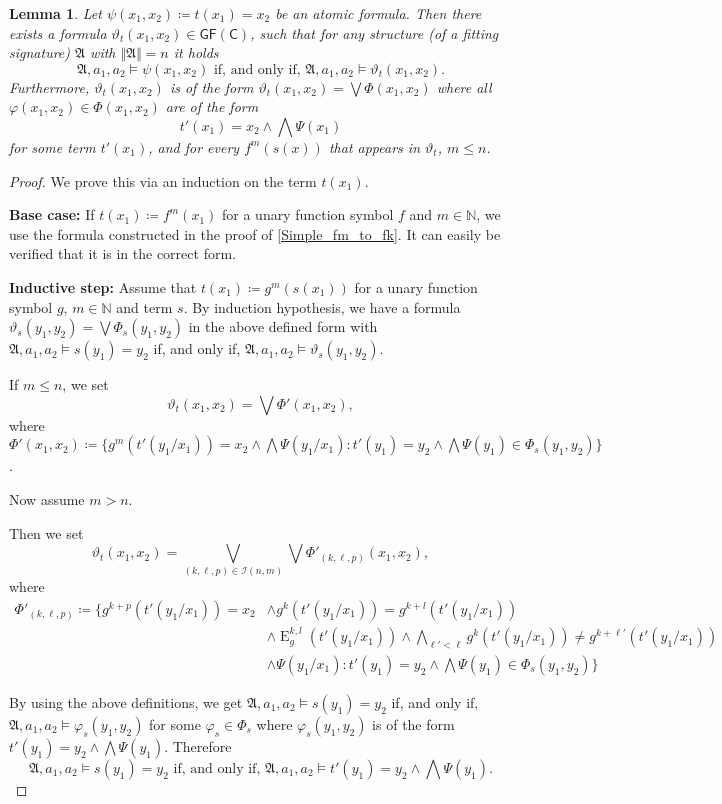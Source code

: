 \documentclass[a4paper,11pt,DIV=15]{scrartcl} %
\renewcommand{\phi}{\varphi}
\theoremstyle{plain}
\newtheorem{lemma}[theorem]{Lemma}
\theoremstyle{definition}
\newcommand{\GFC}{\mathsf{GF}(\mathsf{C})}
\renewcommand{\theta}{\vartheta}
\begin{document}
\begin{lemma}
	Let $\psi(x_1,x_2)\coloneqq t(x_1)=x_2$ be an atomic formula. 
	Then there exists a formula $\theta_{t}(x_1,x_2)\in\GFC$, such that for any structure (of a fitting signature) $\mathfrak A$ with $\Vert \mathfrak A \Vert = n$ it holds
	$$\mathfrak A,a_1,a_2 \models \psi(x_1,x_2) \text{ if, and only if, } \mathfrak A,a_1,a_2 \models \vartheta_{t}(x_1,x_2).$$ 
	Furthermore, $\theta_{t}(x_1,x_2)$ is of the form $\theta_{t}(x_1,x_2)=\bigvee \Phi(x_1,x_2)$ where all $\phi(x_1,x_2)\in\Phi(x_1,x_2)$ are of the form
	$$t'(x_1)=x_2 \land \bigwedge \Psi(x_1)$$ 
	for some term $t'(x_1)$, and for every $f^m(s(x))$ that appears in $\theta_{t}$, $m\leq n$.
\end{lemma}
\begin{proof}
	We prove this via an induction on the term $t(x_1)$.
	
	\textbf{Base case:}
	If $t(x_1)\coloneqq f^{m}(x_1)$ for a unary function symbol $f$ and $m\in \mathbb N$, we use the formula constructed in the proof of \cref{Simple_fm_to_fk}.
	It can easily be verified that it is in the correct form.
	
	\textbf{Inductive step:}
	Assume that $t(x_1)\coloneqq g^m(s(x_1))$ for a unary function symbol $g$, $m\in\mathbb N$ and term $s$.
	By induction hypothesis, we have a formula $\theta_{s}(y_1,y_2)=\bigvee \Phi_s(y_1,y_2)$ in the above defined form with $\mathfrak A,a_1,a_2 \models s(y_1)=y_2$ if, and only if, $\mathfrak A,a_1,a_2\models \theta_{s}(y_1,y_2)$.
	
	If $m\leq n$, we set 
	$$\theta_{t}(x_1,x_2)=\bigvee \Phi'(x_1,x_2),$$
	where $\Phi'(x_1,x_2)\coloneqq\{g^{m}(t'(y_1/x_1))=x_2 \land \bigwedge \Psi(y_1/x_1) : t'(y_1)=y_2 \land \bigwedge \Psi(y_1)\in \Phi_s(y_1,y_2)\}$.
	
	Now assume $m>n$.
	
	Then we set
	$$\theta_{t}(x_1,x_2)=\bigvee_{(k,\ell,p)\in \mathcal I(n,m)} \bigvee \Phi'_{(k,\ell,p)}(x_1,x_2),$$
	where 
	\begin{align*}
		\Phi'_{(k,\ell,p)}\coloneqq \{g^{k+p}(t'(y_1/x_1))=x_2 &\land g^{k}(t'(y_1/x_1))=g^{k+l}(t'(y_1/x_1)) \\
		& \land \operatorname{E}^{k,l}_g(t'(y_1/x_1)) \land \bigwedge_{\ell'<\ell} g^{k}(t'(y_1/x_1))\neq g^{k+\ell'}(t'(y_1/x_1)) \\
		& \land \Psi(y_1/x_1) : t'(y_1)=y_2 \land \bigwedge \Psi(y_1)\in \Phi_s(y_1,y_2)\}
	\end{align*}
	
	By using the above definitions, we get $\mathfrak A,a_1,a_2\models s(y_1)=y_2$ if, and only if, $\mathfrak A,a_1,a_2\models \phi_s(y_1,y_2)$ for some $\phi_s\in\Phi_s$ where $\phi_s(y_1,y_2)$ is of the form $t'(y_1)=y_2 \land \bigwedge \Psi(y_1)$.
	Therefore
	\begin{equation}
		\mathfrak A, a_1,a_2 \models s(y_1)=y_2 \text{ if, and only if, } \mathfrak A,a_1,a_2 \models t'(y_1)=y_2 \land \bigwedge \Psi(y_1).
		\label{Equivalence_s_and_tPsi}
	\end{equation}
	

\end{proof}
\end{document}
